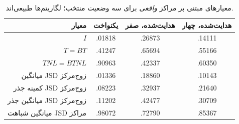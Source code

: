 \begin{table}[htbp]
\centering\small
\caption{معیارهای مبتنی بر مراکز \emph{واقعی} برای سه وضعیت منتخب؛ لگاریتم‌ها طبیعی‌اند.}
\label{tab:ch4-center-observation-geometry}
\begin{tabular}{rccc}\hline
معیار & یکنواخت & هدایت‌شده، صفر & هدایت‌شده، چهار\\\hline
$I$ & .01818 & .26873 & .14111\\
$T=BT$ & .41247 & .65694 & .55166\\
$TNL=BTNL$ & .90963 & .42337 & .60350\\
میانگین JSD زوج‌مرکز & .01336 & .18860 & .10143\\
کمینه جذر JSD زوج‌مرکز & .08223 & .32937 & .21640\\
میانگین جذر JSD زوج‌مرکز & .11202 & .42477 & .30709\\
میانگین شباهت JSD مراکز & .98072 & .72790 & .85367\\\hline
\end{tabular}
\end{table}
